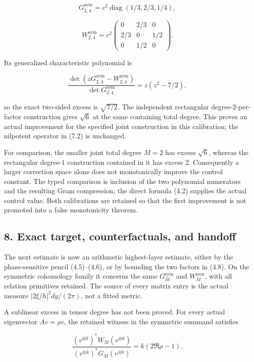 \documentclass[
]{article}
\begin{document}
\[\boxed{G_{2,4}^{\mathrm{sym}}=c^2\operatorname{diag}(1/3,2/3,1/4),}\tag{7.3}\]

\[\boxed{W_{2,4}^{\mathrm{sym}}=c^2
\begin{pmatrix}0&2/3&0\\2/3&0&1/2\\0&1/2&0\end{pmatrix}.}\tag{7.4}\]

Its generalized characteristic polynomial is

\[\frac{\det(zG_{2,4}^{\mathrm{sym}}-W_{2,4}^{\mathrm{sym}})}{\det G_{2,4}^{\mathrm{sym}}}
=z(z^2-7/2),\]

so the exact two-sided excess is \(\sqrt{7/2}\). The independent
rectangular degree-\(2\)-per-factor construction gives \(\sqrt6\) at the
same containing total degree. This proves an actual improvement for the
specified joint construction in this calibration; the nilpotent operator
in (7.2) is unchanged.

For comparison, the smaller joint total degree \(M=2\) has excess
\(\sqrt6\), whereas the rectangular degree-\(1\) construction contained
in it has excess \(2\). Consequently a larger correction space alone
does not monotonically improve the control constant. The typed
comparison is inclusion of the two polynomial numerators and the
resulting Gram compression; the direct formula (4.2) supplies the actual
control value. Both calibrations are retained so that the first
improvement is not promoted into a false monotonicity theorem.

\subsection{8. Exact target, counterfactuals, and
handoff}\label{exact-target-counterfactuals-and-handoff}

The next estimate is now an arithmetic highest-layer estimate, either by
the phase-sensitive pencil (4.5)--(4.6), or by bounding the two factors
in (4.8). On the symmetric cohomology family it concerns the same
\(G_M^{\mathrm{sym}}\) and \(W_M^{\mathrm{sym}}\), with all relation
primitives retained. The source of every matrix entry is the actual
measure \(|2\xi/h|^2dy/(2\pi)\), not a fitted metric.

A sublinear excess in tensor degree has not been proved. For every
actual eigenvector \(Av=\rho v\), the retained witness in the symmetric
summand satisfies

\[\frac{(v^{\otimes k})^*W_M(v^{\otimes k})}
{(v^{\otimes k})^*G_M(v^{\otimes k})}
=k(2\Re\rho-1).\tag{8.1}\]
\end{document}
